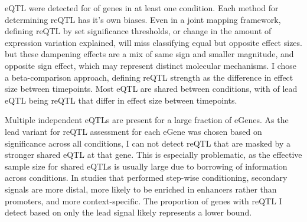 \gls{eQTL} were detected for  of genes in at least one condition.
Each method for determining reQTL has it's own biases.
Even in a joint mapping framework, defining \gls{reQTL} by set significance thresholds, or change in the amount of expression variation explained, will miss classifying equal but opposite effect sizes.
but these dampening effects are a mix of same sign and smaller magnitude, and opposite sign effect,
which may represent distinct molecular mechanisms\autocite{fu2012UnravelingRegulatoryMechanisms}.
I chose a beta-comparison approach, defining reQTL strength as the difference in effect size between timepoints.
Most \gls{eQTL} are shared between conditions, with  of lead \gls{eQTL} being \gls{reQTL} that differ in effect size between timepoints.

Multiple independent eQTLs are present for a large fraction of eGenes.
As the lead variant for reQTL assessment for each eGene was chosen based on significance across all conditions, I can not detect reQTL that are masked by a stronger shared eQTL at that gene.
This is especially problematic, as the effective sample size for shared eQTLs is usually large due to borrowing of information across conditions.
In studies that performed step-wise conditioning,
secondary signals are more distal, more likely to be enriched in enhancers rather than promoters, and more context-specific.
The proportion of genes with reQTL I detect based on only the lead signal likely represents a lower bound.

